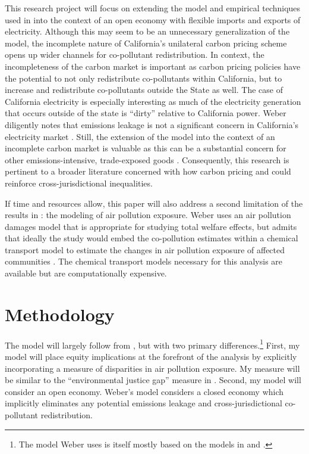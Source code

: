 \documentclass[11pt]{article}
\begin{document}
This research project will focus on extending the model and empirical techniques used in \cite{weber2021dynamic} into the context of an open economy with flexible imports and exports of electricity. Although this may seem to be an unnecessary generalization of the model, the incomplete nature of California's unilateral carbon pricing scheme opens up wider channels for co-pollutant redistribution. In context, the incompleteness of the carbon market is important as carbon pricing policies have the potential to not only redistribute co-pollutants within California, but to increase and redistribute co-pollutants outside the State as well. The case of California electricity is especially interesting as much of the electricity generation that occurs outside of the state is ``dirty” relative to California power. Weber diligently notes that emissions leakage is not a significant concern in California's electricity market \citep{burtraw2018}. Still, the extension of the model into the context of an incomplete carbon market is valuable as this can be a substantial concern for other emissions-intensive, trade-exposed goods \citep{fowlie2022mitigating}. Consequently, this research is pertinent to a broader literature concerned with how carbon pricing and could reinforce cross-jurisdictional inequalities. 

If time and resources allow, this paper will also address a second limitation of the results in \cite{weber2021dynamic}: the modeling of air pollution exposure. Weber uses an air pollution damages model that is appropriate for studying total welfare effects, but admits that ideally the study would embed the co-pollution estimates within a chemical transport model to estimate the changes in air pollution exposure of affected communities \citep[the approach in~][]{hernandez2023environmental}. The chemical transport models necessary for this analysis are available but are computationally expensive.


\section*{Methodology}

The model will largely follow from \cite{weber2021dynamic}, but with two primary differences.\footnote{The model Weber uses is itself mostly based on the models in \cite{cullen2015} and \cite{cullen2017}.} First, my model will place equity implications at the forefront of the analysis by explicitly incorporating a measure of disparities in air pollution exposure. My measure will be similar to the ``environmental justice gap'' measure in \cite{hernandez2022importance}. Second, my model will consider an open economy. Weber's model considers a closed economy which implicitly eliminates any potential emissions leakage and cross-jurisdictional co-pollutant redistribution. 
\end{document}
